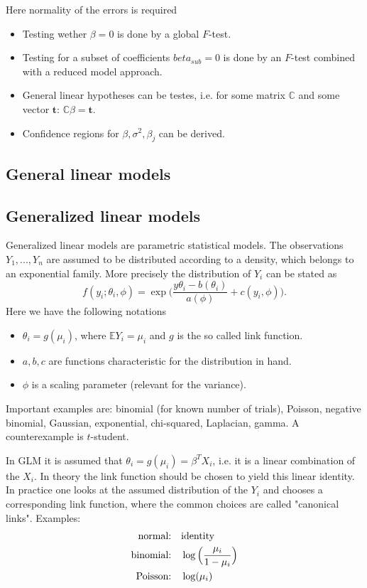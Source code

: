 \documentclass[12pt,a4paper]{amsart}
\theoremstyle{definition}
\theoremstyle{remark}
\numberwithin{equation}{section}
\begin{document}
\begin{itemize}
Here normality of the errors is required
\begin{itemize}
\item Testing wether $\beta=0$ is done by a global $F$-test.
\item Testing for a subset of coefficients $beta_{sub}=0$ is done by an $F$-test combined with a reduced model approach.
\item General linear hypotheses can be testes, i.e. for some matrix $\mathbb{C}$ and some vector $\mathbf{t}$: $\mathbb{C}\beta=\mathbf{t}$.
\item Confidence regions for $\beta, \sigma^2, \beta_j$ can be derived. 
\end{itemize}
\end{itemize}

\subsection{General linear models}

\subsection{Generalized linear models}

Generalized linear models are parametric statistical models. The observations $Y_1,...,Y_n$ are assumed to be distributed according to a density, which belongs to an exponential family. More precisely the distribution of $Y_i$ can be stated as
$$ f(y_i; \theta_i, \phi)= \exp \Big(\frac{y \theta_i - b(\theta_i)}{a(\phi)}+c(y_i, \phi) \Big).$$
Here we have the following notations
\begin{itemize}
\item $\theta_i=g(\mu_i)$, where $\mathbb{E}Y_i=\mu_i$ and $g$ is the so called link function. 
\item $a, b, c$ are functions characteristic for the distribution in hand.
\item $\phi$ is a scaling parameter (relevant for the variance).
\end{itemize}

Important examples are: binomial (for known number of trials), Poisson, negative binomial, Gaussian, exponential, chi-squared, Laplacian, gamma. A counterexample is $t$-student.

In GLM it is assumed that $\theta_i =g(\mu_i)= \beta^T X_i$, i.e. it is a linear combination of the $X_i$. In theory the link function should be chosen to yield this linear identity. In practice one looks at the assumed distribution of the $Y_i$ and chooses a corresponding link function, where the common choices are called "canonical links". Examples: 
\begin{align*} 
\textnormal{normal:} & \quad \textnormal{identity} \\
\textnormal{binomial:} & \quad \log\Big( \frac{\mu_i}{1-\mu_i}\Big) \\
\textnormal{Poisson:} & \quad \log(\mu_i)
\end{align*}
\end{document}
